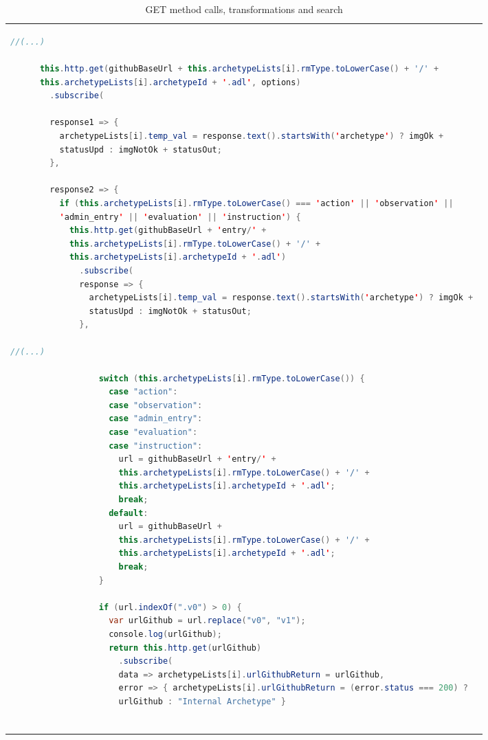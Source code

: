 \documentclass[mim_thesis.tex]{subfiles}
\begin{document}
\begin{table}[H]
\caption{GET method calls, transformations and search}
\label{tab:code_calls}
\centering
\begin{tabular}{l}
\toprule[2pt]
\begin{lstlisting}[language=java]
//(...)

      this.http.get(githubBaseUrl + this.archetypeLists[i].rmType.toLowerCase() + '/' + 
      this.archetypeLists[i].archetypeId + '.adl', options)
        .subscribe(
        
        response1 => {
          archetypeLists[i].temp_val = response.text().startsWith('archetype') ? imgOk + 
          statusUpd : imgNotOk + statusOut;
        },

        response2 => {
          if (this.archetypeLists[i].rmType.toLowerCase() === 'action' || 'observation' || 
          'admin_entry' || 'evaluation' || 'instruction') {
            this.http.get(githubBaseUrl + 'entry/' + 
            this.archetypeLists[i].rmType.toLowerCase() + '/' + 
            this.archetypeLists[i].archetypeId + '.adl')
              .subscribe(
              response => {
                archetypeLists[i].temp_val = response.text().startsWith('archetype') ? imgOk + 
                statusUpd : imgNotOk + statusOut;
              },
              
//(...)

                  switch (this.archetypeLists[i].rmType.toLowerCase()) {
                    case "action":
                    case "observation":
                    case "admin_entry":
                    case "evaluation":
                    case "instruction":
                      url = githubBaseUrl + 'entry/' + 
                      this.archetypeLists[i].rmType.toLowerCase() + '/' + 
                      this.archetypeLists[i].archetypeId + '.adl';
                      break;
                    default:
                      url = githubBaseUrl +
                      this.archetypeLists[i].rmType.toLowerCase() + '/' + 
                      this.archetypeLists[i].archetypeId + '.adl';  
                      break;
                  }

                  if (url.indexOf(".v0") > 0) {
                    var urlGithub = url.replace("v0", "v1");
                    console.log(urlGithub);
                    return this.http.get(urlGithub)
                      .subscribe(
                      data => archetypeLists[i].urlGithubReturn = urlGithub,
                      error => { archetypeLists[i].urlGithubReturn = (error.status === 200) ? 
                      urlGithub : "Internal Archetype" }
                      

\end{lstlisting}
\end{tabular}
\end{table}
\end{document}

